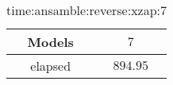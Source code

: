 \begin{table}[!ht]
	\centering
	\begin{tabular}{|c|c|}
		\hline
		Models & $7$ \\ \hline
		elapsed & $894.95$ \\ \hline
	\end{tabular}
	\caption{time:ansamble:reverse:xzap:7}
	\label{tab:time:ansamble:reverse:xzap:7}
\end{table}
